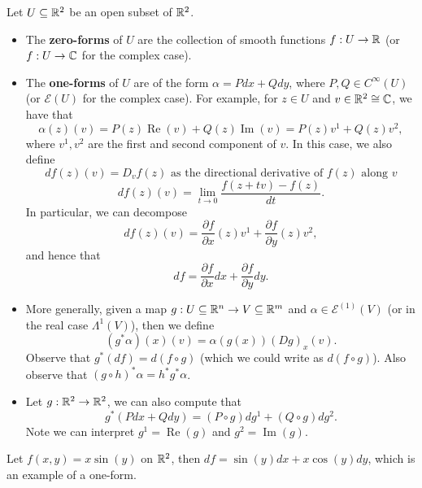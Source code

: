 \documentclass{article}
\begin{document}
{\begin{definition}
Let $U \subseteq \mathbb{R}^2$ be an open subset of $\mathbb{R}^2$.
\begin{itemize}
    \item The \textbf{zero-forms} of $U$ are the collection of smooth functions $f: U \to \mathbb{R}$ (or $f: U \to \mathbb{C}$ for the complex case).
    \item The \textbf{one-forms} of $U$ are of the form $\alpha = P dx + Q dy$, where $P, Q \in C^\infty(U)$ (or $\mathcal{E}(U)$ for the complex case). For example, for $z \in U$ and $v \in \mathbb{R}^2 \cong \mathbb{C}$, we have that
    \[\alpha(z)(v) = P(z) \operatorname{Re}(v) + Q(z) \operatorname{Im}(v) = P(z) v^1 + Q(z) v^2,\]
    where $v^1, v^2$ are the first and second component of $v$. In this case, we also define
    \[df(z)(v) = D_v f(z) \text{ as the directional derivative of $f(z)$ along $v$} \]
    \[df(z)(v) = \lim_{t \to 0} \frac{f(z + tv) - f(z)}{dt}.\]
    In particular, we can decompose
    \[df(z)(v) = \frac{\partial f}{\partial x}(z) v^1 + \frac{\partial f}{\partial y}(z) v^2,\]
    and hence that
    \[df = \frac{\partial f}{\partial x} dx + \frac{\partial f}{\partial y} dy.\]
    \item More generally, given a map $g: U \subseteq \mathbb{R}^n \to V \subseteq \mathbb{R}^m$ and $\alpha \in \mathcal{E}^{(1)}(V)$ (or in the real case $\Lambda^1(V)$), then we define
    \[(g^* \alpha)(x)(v) = \alpha(g(x))(Dg)_x(v).\]
    Observe that $g^*(df) = d(f \circ g)$ (which we could write as $d(f \circ g)$). Also observe that $(g \circ h)^* \alpha = h^* g^* \alpha$.
    \item Let $g: \mathbb{R}^2 \to \mathbb{R}^2$, we can also compute that
    \[g^*(P dx + Q dy) = (P \circ g) dg^1 + (Q \circ g) dg^2.\]
    Note we can interpret $g^1 = \operatorname{Re}(g)$ and $g^2 = \operatorname{Im}(g)$.
\end{itemize}
\end{definition}

\begin{example}
    Let $f(x, y) = x \sin(y)$ on $\mathbb{R}^2$, then $df = \sin(y) dx + x \cos(y) dy$, which is an example of a one-form.
\end{example}

}
\end{document}
